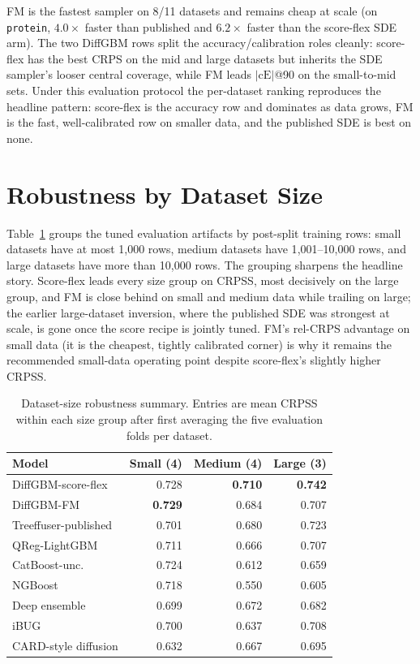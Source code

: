 \documentclass{article}
\begin{document}
FM is the fastest sampler on 8/11 datasets and remains cheap at scale (on \texttt{protein}, $4.0\times$ faster than published and $6.2\times$ faster than the score-flex SDE arm). The two DiffGBM rows split the accuracy/calibration roles cleanly: score-flex has the best CRPS on the mid and large datasets but inherits the SDE sampler's looser central coverage, while FM leads $|\text{cE}|$@90 on the small-to-mid sets. Under this evaluation protocol the per-dataset ranking reproduces the headline pattern: score-flex is the accuracy row and dominates as data grows, FM is the fast, well-calibrated row on smaller data, and the published SDE is best on none.

\section{Robustness by Dataset Size}\label{app:robustness}

Table~\ref{tab:robustness-size} groups the tuned evaluation artifacts by post-split training rows: small datasets have at most 1{,}000 rows, medium datasets have 1{,}001--10{,}000 rows, and large datasets have more than 10{,}000 rows. The grouping sharpens the headline story. Score-flex leads every size group on CRPSS, most decisively on the large group, and FM is close behind on small and medium data while trailing on large; the earlier large-dataset inversion, where the published SDE was strongest at scale, is gone once the score recipe is jointly tuned. FM's rel-CRPS advantage on small data (it is the cheapest, tightly calibrated corner) is why it remains the recommended small-data operating point despite score-flex's slightly higher CRPSS.

\begin{table}[!h]
  \centering
  \caption{Dataset-size robustness summary. Entries are mean CRPSS within each size group after first averaging the five evaluation folds per dataset.}\label{tab:robustness-size}
  \scriptsize
  \begin{tabular}{lrrr}
    \toprule
    Model & Small (4) & Medium (4) & Large (3) \\
    \midrule
    DiffGBM-score-flex & 0.728 & \textbf{0.710} & \textbf{0.742} \\
    DiffGBM-FM & \textbf{0.729} & 0.684 & 0.707 \\
    Treeffuser-published & 0.701 & 0.680 & 0.723 \\
    QReg-LightGBM & 0.711 & 0.666 & 0.707 \\
    CatBoost-unc. & 0.724 & 0.612 & 0.659 \\
    NGBoost & 0.718 & 0.550 & 0.605 \\
    Deep ensemble & 0.699 & 0.672 & 0.682 \\
    iBUG & 0.700 & 0.637 & 0.708 \\
    CARD-style diffusion & 0.632 & 0.667 & 0.695 \\
    \bottomrule
  \end{tabular}
\end{table}
\end{document}
